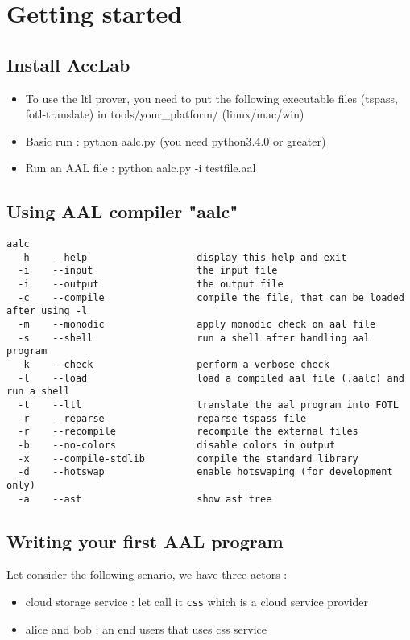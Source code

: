 \section{Getting started}

\subsection{Install AccLab}
\begin{itemize}
  \item To use the ltl prover, you need to put the following executable files (tspass, fotl-translate) in tools/your\_platform/ (linux/mac/win)
  \item Basic run : python aalc.py (you need python3.4.0 or greater)
  \item Run an AAL file : python aalc.py -i testfile.aal
\end{itemize}


\subsection{Using AAL compiler "aalc"}
{\lstset{style=shell}
\begin{lstlisting}[caption={aalc options}]
aalc 
  -h    --help                   display this help and exit
  -i    --input                  the input file
  -i    --output                 the output file
  -c    --compile                compile the file, that can be loaded after using -l
  -m    --monodic                apply monodic check on aal file
  -s    --shell                  run a shell after handling aal program
  -k    --check                  perform a verbose check
  -l    --load                   load a compiled aal file (.aalc) and run a shell
  -t    --ltl                    translate the aal program into FOTL
  -r    --reparse                reparse tspass file
  -r    --recompile              recompile the external files
  -b    --no-colors              disable colors in output
  -x    --compile-stdlib         compile the standard library
  -d    --hotswap                enable hotswaping (for development only)
  -a    --ast                    show ast tree
\end{lstlisting}
}

\subsection{Writing your first AAL program}
Let consider the following senario, we have three actors :
\begin{itemize}
    \item cloud storage service : let call it \texttt{css} which is a cloud service provider
    \item alice and bob : an end users that uses css service
\end{itemize}

